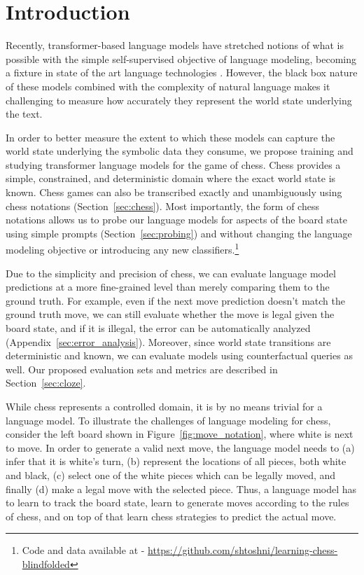 

\section{Introduction}

Recently, transformer-based language models 
have stretched notions of what is possible with the simple self-supervised objective of language modeling, becoming
a fixture in state of the art language technologies
\citep{vaswani2017attention, devlin-etal-2019-bert, brown2020language}.
However, the black box nature of these models combined with the complexity of natural language makes it
challenging to measure how accurately they
represent the world state underlying the text.

In order to better measure the extent to which these models can capture the world state underlying the symbolic data they consume, we propose training and studying
transformer language models for the game of chess.
Chess provides a simple, constrained, and deterministic domain where the exact world state is known.
Chess games can also be transcribed exactly and unambiguously using chess notations (Section~\ref{sec:chess}).
Most importantly, the form of chess notations allows us to probe our language models for aspects of the board state using simple prompts (Section~\ref{sec:probing}) and without changing the language modeling objective or introducing any new classifiers.\footnote{Code and data available at - \url{https://github.com/shtoshni/learning-chess-blindfolded}}



Due to the simplicity and precision of chess, we can evaluate language model predictions at a more fine-grained level than merely comparing them to the ground truth.
For example, even if the next move prediction doesn't match the ground truth move, we can still evaluate whether the move is legal given the board state, and if it is illegal, the error can be automatically analyzed (Appendix~\ref{sec:error_analysis}).
Moreover, since world state transitions are deterministic and known, we can  evaluate models using counterfactual queries as well.
Our proposed evaluation sets and metrics are described in Section~\ref{sec:cloze}.



While chess represents a controlled domain,
it is by no means trivial for a language model.
To illustrate the challenges of language modeling for chess,
consider the left board shown in Figure~\ref{fig:move_notation}, where white is next to move.
In order to generate a valid next move, the language model needs to (a) infer that it is white's turn, (b) represent the locations of all pieces, both white and black, (c) select one of the white pieces which can be legally moved, and finally (d) make a legal move with the selected piece.
Thus, a language model has to learn to track the board state, learn to generate moves according to the rules of chess, and on top of that learn chess strategies to predict the actual move. %



